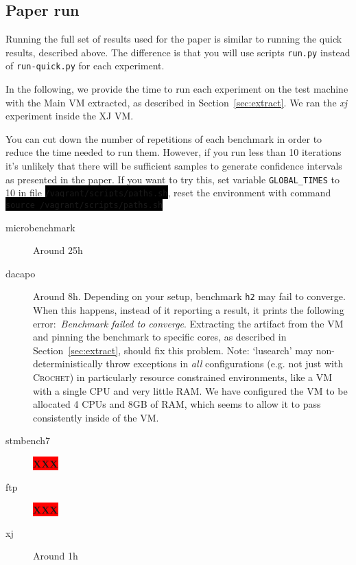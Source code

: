 \documentclass[12pt]{article}
\newcommand{\command}[1]{\colorbox{black}{\texttt{\color{white}#1}}}
\newcommand{\XXX}{\colorbox{red}{\bf\color{white}XXX}}
\newcommand{\sysname}{\textsc{Crochet}\xspace}
\begin{document}
\subsection{Paper run}
\label{sec:paper-run}

Running the full set of results used for the paper is similar to running the
quick results, described above.  The difference is that you will use scripts
\texttt{run.py} instead of \texttt{run-quick.py} for each experiment.

In the following, we provide the time to run each experiment on the
test machine with the Main VM extracted, as described in
Section~\ref{sec:extract}.  We ran the \emph{xj} experiment inside the XJ VM.

You can cut down the number of repetitions of each benchmark in order to reduce the time needed to run them. However, if you run less than 10 iterations it's unlikely that there will be sufficient samples to generate confidence intervals as presented in the paper. If you want to try this, set variable \texttt{GLOBAL\_TIMES} to
        10 in file \command{/vagrant/scripts/paths.sh}, reset the environment with
        command \command{source /vagrant/scripts/paths.sh} 

\begin{description}

    \item[microbenchmark] Around 25h

    \item[dacapo] Around 8h.  Depending on your setup, benchmark \texttt{h2} may
        fail to converge.  When this happens, instead of it reporting a result,
        it prints the following error:~\emph{Benchmark failed to converge}.
        Extracting the artifact from the VM and pinning the benchmark to
        specific cores, as described in Section~\ref{sec:extract}, should fix
        this problem. Note: `lusearch' may non-deterministically throw exceptions in \emph{all} configurations (e.g. not just with \sysname) in particularly resource constrained environments, like a VM with a single CPU and very little RAM. We have configured the VM to be allocated 4 CPUs and 8GB of RAM, which seems to allow it to pass consistently inside of the VM. 

    \item[stmbench7] \XXX

    \item[ftp] \XXX

    \item[xj] Around 1h

\end{description}
\end{document}
